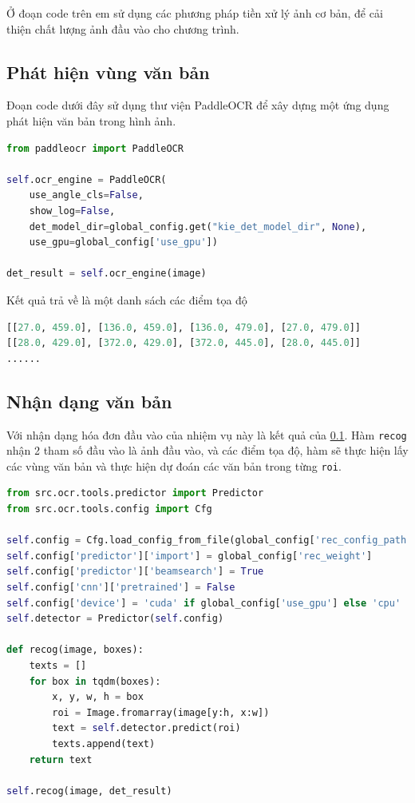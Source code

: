 Ở đoạn code trên em sử dụng các phương pháp tiền xử lý ảnh cơ bản, để cải thiện chất lượng ảnh đầu vào cho chương trình.
\subsection{Phát hiện vùng văn bản} \label{detsec}
Đoạn code dưới đây sử dụng thư viện PaddleOCR để xây dựng một ứng dụng phát hiện văn bản trong hình ảnh.
\begin{lstlisting}[language=Python]
from paddleocr import PaddleOCR

self.ocr_engine = PaddleOCR(
    use_angle_cls=False,
    show_log=False,
    det_model_dir=global_config.get("kie_det_model_dir", None),
    use_gpu=global_config['use_gpu'])

det_result = self.ocr_engine(image)
\end{lstlisting}
Kết quả trả về là một danh sách các điểm tọa độ
\begin{lstlisting}[language=Python]
[[27.0, 459.0], [136.0, 459.0], [136.0, 479.0], [27.0, 479.0]]
[[28.0, 429.0], [372.0, 429.0], [372.0, 445.0], [28.0, 445.0]]
......
\end{lstlisting}

\subsection{Nhận dạng văn bản}
Với nhận dạng hóa đơn đầu vào của nhiệm vụ này là kết quả của \ref{detsec}. Hàm \texttt{recog} nhận 2 tham số đầu vào là ảnh đầu vào, và các điểm tọa độ, hàm sẽ thực hiện lấy các vùng văn bản và thực hiện dự đoán các văn bản trong từng \texttt{roi}.
\begin{lstlisting}[language=Python]
from src.ocr.tools.predictor import Predictor
from src.ocr.tools.config import Cfg

self.config = Cfg.load_config_from_file(global_config['rec_config_path'])
self.config['predictor']['import'] = global_config['rec_weight']
self.config['predictor']['beamsearch'] = True
self.config['cnn']['pretrained'] = False
self.config['device'] = 'cuda' if global_config['use_gpu'] else 'cpu'
self.detector = Predictor(self.config)

def recog(image, boxes):
    texts = []
    for box in tqdm(boxes):
        x, y, w, h = box
        roi = Image.fromarray(image[y:h, x:w])
        text = self.detector.predict(roi)
        texts.append(text)
    return text

self.recog(image, det_result)

\end{lstlisting}

